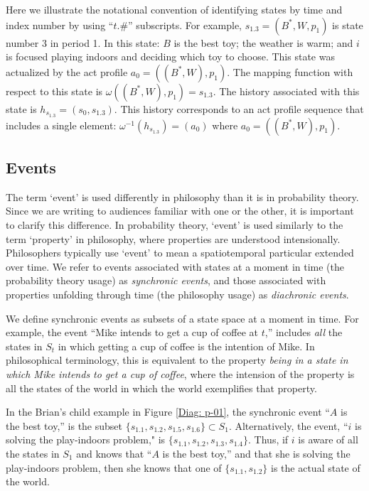 \documentclass[
11pt,
titlepage,
reqno,
]{article}%
\theoremstyle{definition}
\begin{document}
Here we illustrate the notational convention of identifying states by time and index number by using ``$t.\#$'' subscripts.
For example, $s_{1.3}=(B^\ast,W,p_1)$ is state number 3 in period 1.
In this state: $B$ is the best toy; the weather is warm; and $i$ is focused playing indoors and deciding which toy to choose.
This state was actualized by the act profile $a_0=((B^\ast,W),p_1)$.
The mapping function with respect to this state is $\omega((B^\ast,W),p_1)=s_{1.3}$.
The history associated with this state is $h_{s_{1.3}}=(s_0,s_{1.3})$.
This history corresponds to an act profile  sequence that includes a single element:  $\omega^{-1}(h_{s_{1.3}})=(a_0)$ where $a_0=((B^\ast,W),p_1)$.
	
	
\subsection{Events}

The term `event' is used differently in philosophy than it is in probability theory. 
Since we are writing to audiences familiar with one or the other, it is important to clarify this difference. 
In probability theory, `event' is used similarly to the term `property' in philosophy, where properties are understood intensionally. 
Philosophers typically use `event' to mean a spatiotemporal particular extended over time. 
We refer to events associated with states at a moment in time (the probability theory usage) as \textit{synchronic events}, and those associated with properties unfolding through time (the philosophy usage) as \textit{diachronic events}.

We define synchronic events as subsets of a state space at a moment in time. 
For example, the event ``Mike intends to get a cup of coffee at $t$,'' includes \textit{all} the states in $S_t$ in which getting a cup of coffee is the intention of Mike. 
In philosophical terminology, this is equivalent to the property \textit{being in a state in which Mike intends to get a cup of coffee}, where the intension of the property is all the states of the world in which the world exemplifies that property.

In the Brian's child example in Figure \ref{Diag: p-01}, the synchronic event ``$A$ is the best toy,'' is the subset $\{s_{1.1},s_{1.2},s_{1.5},s_{1.6}\}\subset S_1$.
Alternatively, the event, ``$i$ is solving the play-indoors problem," is $\{s_{1.1},s_{1.2},s_{1.3},s_{1.4}\}$.
Thus, if $i$ is aware of all the states in $S_1$ and knows that ``$A$ is the best toy,'' and that she is solving the play-indoors problem, then she knows that one of $\{s_{1.1},s_{1.2}\}$ is the actual state of the world.
\end{document}
